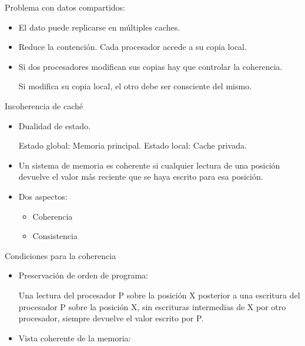 \documentclass[12pt, twoside, openright]{report} %
\begin{document}
\begin{itemize}
      Problema con datos compartidos:

      \begin{itemize}
      
      \item
        El dato puede replicarse en múltiples caches.
      \item
        Reduce la contención. Cada procesador accede a su copia local.
      \item
        Si dos procesadores modifican sus copias hay que controlar la
        coherencia.

        
          Si modifica su copia local, el otro debe ser consciente del
          mismo.
      \end{itemize}

      Incoherencia de caché

      \begin{itemize}
      
      \item
        Dualidad de estado.

        
          Estado global: Memoria principal.
          Estado local: Cache privada.
      \item
        Un sistema de memoria es coherente si cualquier lectura de una
        posición devuelve el valor más reciente que se haya escrito
        para esa posición.
      \item
        Dos aspectos:
        \begin{itemize}
          \item Coherencia

          \item Consistencia
        \end{itemize}
        

      \end{itemize}

      Condiciones para la coherencia

      \begin{itemize}
      
      \item
        Preservación de orden de programa:

        Una lectura del procesador P sobre la posición X posterior a
          una escritura del procesador P sobre la posición X, sin
          escrituras intermedias de X por otro procesador, siempre
          devuelve el valor escrito por P.

          \item
        Vista coherente de la memoria:



\end{itemize}
\end{itemize}
\end{document}
